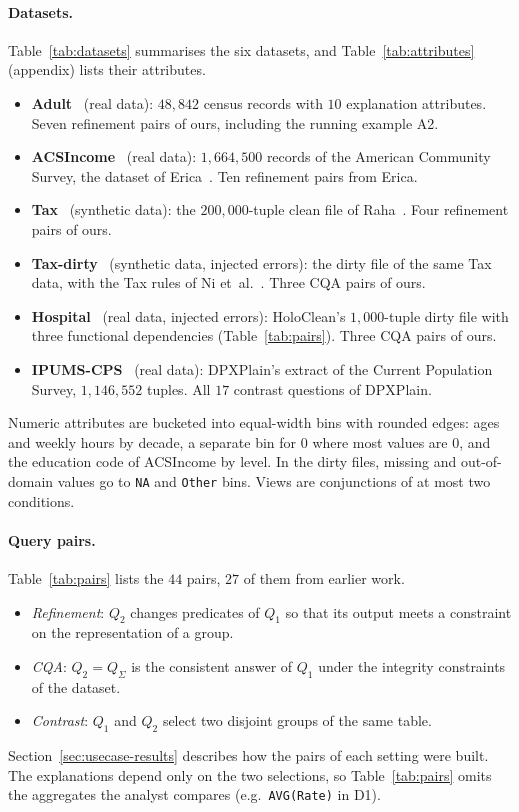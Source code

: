 \paragraph{Datasets.}
Table~\ref{tab:datasets} summarises the six datasets, and Table~\ref{tab:attributes} (appendix) lists their attributes.
\begin{itemize}[leftmargin=*,itemsep=1pt,topsep=2pt]
  \item \textbf{Adult}~\cite{adult-uci} (real data): $48{,}842$ census records with $10$ explanation attributes. Seven refinement pairs of ours, including the running example A2.
  \item \textbf{ACSIncome}~\cite{DingHMS21} (real data): $1{,}664{,}500$ records of the American Community Survey, the dataset of Erica~\cite{LMSJ23,ERICA}. Ten refinement pairs from Erica.
  \item \textbf{Tax}~\cite{BohannonFGJK07} (synthetic data): the $200{,}000$-tuple clean file of Raha~\cite{MahdaviAFMOST19}. Four refinement pairs of ours.
  \item \textbf{Tax-dirty}~\cite{MahdaviAFMOST19} (synthetic data, injected errors): the dirty file of the same Tax data, with the Tax rules of Ni et~al.~\cite{NiMZWLY24}. Three CQA pairs of ours.
  \item \textbf{Hospital}~\cite{rekatsinas2017} (real data, injected errors): HoloClean's $1{,}000$-tuple dirty file with three functional dependencies (Table~\ref{tab:pairs}). Three CQA pairs of ours.
  \item \textbf{IPUMS-CPS}~\cite{TaoGMR22} (real data): DPXPlain's extract of the Current Population Survey, $1{,}146{,}552$ tuples. All $17$ contrast questions of DPXPlain.
\end{itemize}
Numeric attributes are bucketed into equal-width bins with rounded edges: ages and weekly hours by decade, a separate bin for $0$ where most values are $0$, and the education code of ACSIncome by level.
In the dirty files, missing and out-of-domain values go to \texttt{NA} and \texttt{Other} bins.
Views are conjunctions of at most two conditions.

\paragraph{Query pairs.}
Table~\ref{tab:pairs} lists the $44$ pairs, $27$ of them from earlier work.
\begin{itemize}[leftmargin=*,itemsep=1pt,topsep=2pt]
  \item \emph{Refinement}: $Q_2$ changes predicates of $Q_1$ so that its output meets a constraint on the representation of a group.
  \item \emph{CQA}: $Q_2=Q_\Sigma$ is the consistent answer of $Q_1$ under the integrity constraints of the dataset.
  \item \emph{Contrast}: $Q_1$ and $Q_2$ select two disjoint groups of the same table.
\end{itemize}
Section~\ref{sec:usecase-results} describes how the pairs of each setting were built.
The explanations depend only on the two selections, so Table~\ref{tab:pairs} omits the aggregates the analyst compares (e.g.\ \texttt{AVG(Rate)} in D1).


